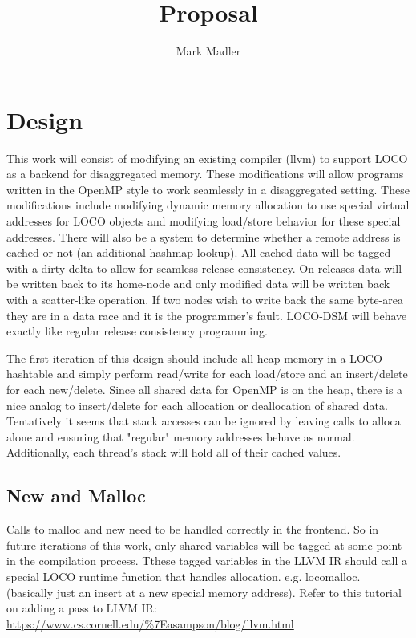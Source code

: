 \documentclass[sigplan,nonacm]{acmart}
\title{Proposal}
\author{Mark Madler}
\begin{document}
\maketitle

\section{Design}
This work will consist of modifying an existing compiler (llvm) to 
support LOCO as a backend for disaggregated memory. These modifications will allow programs 
written in the OpenMP style to work seamlessly in a disaggregated setting.
These modifications include modifying dynamic memory allocation to use special 
virtual addresses for LOCO objects and modifying load/store behavior for these 
special addresses. 
There will also be a system to determine whether a remote address is cached or not (an additional 
hashmap lookup).
All cached data will be tagged with a dirty delta to allow for seamless release consistency. 
On releases data will be written back to its home-node and only modified data will be written back 
with a scatter-like operation. If two nodes wish to write back the same byte-area they are in a data race 
and it is the programmer's fault. LOCO-DSM will behave exactly like regular release consistency programming.

The first iteration of this design should include all heap memory in a LOCO hashtable and
simply perform read/write for each load/store and an insert/delete for each new/delete. 
Since all shared data for OpenMP is on the heap, there is a nice analog to insert/delete 
for each allocation or deallocation of shared data. Tentatively it seems that stack
accesses can be ignored by leaving calls to alloca alone and ensuring that "regular" 
memory addresses behave as normal. Additionally, each thread's stack will hold all of their
cached values.

\subsection{New and Malloc}
Calls to malloc and new need to be handled correctly in the frontend. So in future
iterations of this work, only shared variables will be tagged at some point in the 
compilation process. Tthese tagged variables in the LLVM IR should call a special LOCO 
runtime function that handles allocation. e.g. locomalloc. (basically just an insert at a new special memory address).
Refer to this tutorial on adding a pass to LLVM IR: \url{https://www.cs.cornell.edu/%7Easampson/blog/llvm.html}
\end{document}
